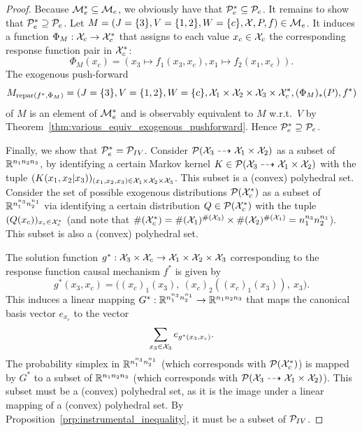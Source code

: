 \begin{proof}
  Because $\mathcal{M}_e^* \subseteq \mathcal{M}_e$, we obviously have that $\mathcal{P}_e^* \subseteq \mathcal{P}_e$. It remains to show that $\mathcal{P}_e^* \supseteq \mathcal{P}_e$.
  Let $M = \left ( J=\{3\}, V=\{1,2\}, W=\{c\}, \mathcal{X}, P, f \right ) \in \mathcal{M}_e$.
  It induces a function $\Phi_M : \mathcal{X}_c \to \mathcal{X}_c^*$ that assigns to each value $x_c \in \mathcal{X}_c$ the corresponding response function pair in $\mathcal{X}_c^*$:
  $$\Phi_M(x_c) = (x_3 \mapsto f_1(x_3, x_c), x_1 \mapsto f_2(x_1, x_c)).$$
  The exogenous push-forward
  $$M_{\mathrm{repar}({f^*},{\Phi_M})} = \left ( J=\{3\}, V=\{1,2\}, W=\{c\}, \mathcal{X}_1 \times \mathcal{X}_2 \times \mathcal{X}_3 \times \mathcal{X}_{c}^*, (\Phi_M)_*(P), f^* \right )$$
  of $M$ is an element of $\mathcal{M}_e^*$ and is observably equivalent to $M$ w.r.t.\ $V$ by Theorem~\ref{thm:various_equiv_exogenous_pushforward}.
  Hence $\mathcal{P}_e^* \supseteq \mathcal{P}_e$.

  Finally, we show that $\mathcal{P}_e^* = \mathcal{P}_{IV}$.
  Consider $\mathcal{P}(\mathcal{X}_3 \dashrightarrow \mathcal{X}_1 \times \mathcal{X}_2)$ as a subset of $\mathbb{R}^{n_1 n_2 n_3}$, by identifying a certain Markov kernel $K \in \mathcal{P}(\mathcal{X}_3 \dashrightarrow \mathcal{X}_1 \times \mathcal{X}_2)$ with the tuple $(K(x_1,x_2|x_3))_{(x_1,x_2,x_3) \in \mathcal{X}_1 \times \mathcal{X}_2 \times \mathcal{X}_3}$.
  This subset is a (convex) polyhedral set.
  Consider the set of possible exogenous distributions $\mathcal{P}(\mathcal{X}_c^*)$ as a subset of $\mathbb{R}^{n_1^{n_3} n_2^{n_1}}$
  via identifying a certain distribution $Q \in \mathcal{P}(\mathcal{X}_c^*)$ with the tuple
  $(Q(x_c))_{x_c \in \mathcal{X}_c^*}$
  (and note that $\#(\mathcal{X}_c^*) = \#(\mathcal{X}_1)^{\#(\mathcal{X}_3)} \times \#(\mathcal{X}_2)^{\#(\mathcal{X}_1)} = n_1^{n_3} n_2^{n_1}$).
  This subset is also a (convex) polyhedral set.

  The solution function $g^* : \mathcal{X}_3 \times \mathcal{X}_c \to \mathcal{X}_1 \times \mathcal{X}_2 \times \mathcal{X}_3$ corresponding to the response function causal mechanism $f^*$ is given by
  $$g^*(x_3,x_c) = \big((x_c)_1(x_3),\ (x_c)_2((x_c)_1(x_3)),\ x_3\big).$$
  This induces a linear mapping $G^* : \mathbb{R}^{n_1^{n_3} n_2^{n_1}} \to \mathbb{R}^{n_1 n_2 n_3}$ that maps the canonical basis vector $e_{x_c}$ to the vector
  $$\sum_{x_3 \in \mathcal{X}_3} e_{g^*(x_3,x_c)}.$$
  The probability simplex in $\mathbb{R}^{n_1^{n_3} n_2^{n_1}}$ (which corresponds with $\mathcal{P}(\mathcal{X}_c^*)$) is mapped by $G^*$ to a subset of $\mathbb{R}^{n_1 n_2 n_3}$ (which corresponds with $\mathcal{P}(\mathcal{X}_3 \dashrightarrow \mathcal{X}_1 \times \mathcal{X}_2)$).
  This subset must be a (convex) polyhedral set, as it is the image under a linear mapping of a (convex) polyhedral set.
  By Proposition~\ref{prp:instrumental_inequality}, it must be a subset of $\mathcal{P}_{IV}$.


\end{proof}
